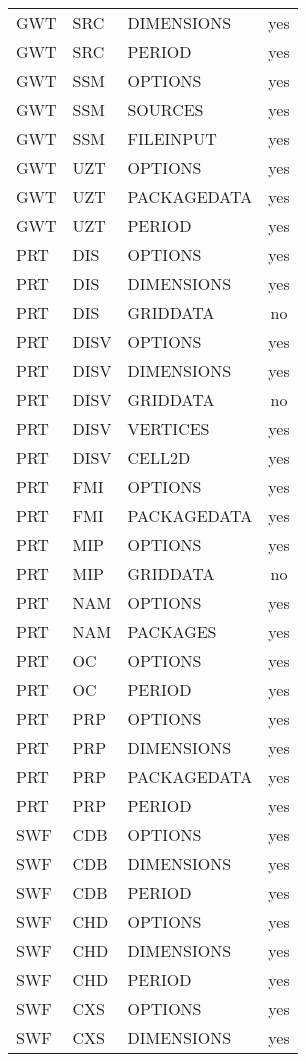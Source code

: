 \begin{longtable}{p{1.5cm} p{1.5cm} p{3cm} c}
GWT & SRC & DIMENSIONS & yes \\ 
GWT & SRC & PERIOD & yes \\ 
\hline
GWT & SSM & OPTIONS & yes \\ 
GWT & SSM & SOURCES & yes \\ 
GWT & SSM & FILEINPUT & yes \\ 
\hline
GWT & UZT & OPTIONS & yes \\ 
GWT & UZT & PACKAGEDATA & yes \\ 
GWT & UZT & PERIOD & yes \\ 
\hline
PRT & DIS & OPTIONS & yes \\ 
PRT & DIS & DIMENSIONS & yes \\ 
PRT & DIS & GRIDDATA & no \\ 
\hline
PRT & DISV & OPTIONS & yes \\ 
PRT & DISV & DIMENSIONS & yes \\ 
PRT & DISV & GRIDDATA & no \\ 
PRT & DISV & VERTICES & yes \\ 
PRT & DISV & CELL2D & yes \\ 
\hline
PRT & FMI & OPTIONS & yes \\ 
PRT & FMI & PACKAGEDATA & yes \\ 
\hline
PRT & MIP & OPTIONS & yes \\ 
PRT & MIP & GRIDDATA & no \\ 
\hline
PRT & NAM & OPTIONS & yes \\ 
PRT & NAM & PACKAGES & yes \\ 
\hline
PRT & OC & OPTIONS & yes \\ 
PRT & OC & PERIOD & yes \\ 
\hline
PRT & PRP & OPTIONS & yes \\ 
PRT & PRP & DIMENSIONS & yes \\ 
PRT & PRP & PACKAGEDATA & yes \\ 
PRT & PRP & PERIOD & yes \\ 
\hline
SWF & CDB & OPTIONS & yes \\ 
SWF & CDB & DIMENSIONS & yes \\ 
SWF & CDB & PERIOD & yes \\ 
\hline
SWF & CHD & OPTIONS & yes \\ 
SWF & CHD & DIMENSIONS & yes \\ 
SWF & CHD & PERIOD & yes \\ 
\hline
SWF & CXS & OPTIONS & yes \\ 
SWF & CXS & DIMENSIONS & yes \\ 

\end{longtable}
